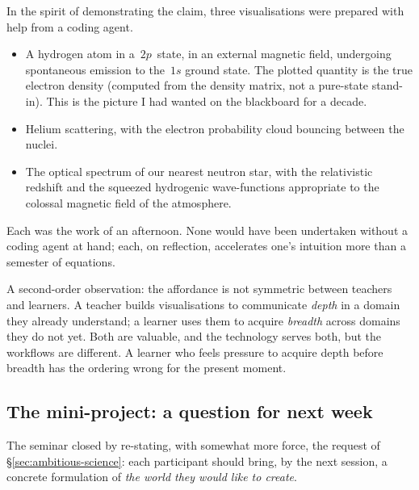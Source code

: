 \begin{historical}
  In the spirit of demonstrating the claim, three
  visualisations were prepared with help from a coding agent.
  \begin{itemize}
    \item A hydrogen atom in a~$2p$~state, in an external
      magnetic field, undergoing spontaneous emission to
      the~$1s$ ground state.  The plotted quantity is the
      true electron density (computed from the density
      matrix, not a pure-state stand-in).  This is the
      picture I had wanted on the blackboard for a decade.
    \item Helium scattering, with the electron probability
      cloud bouncing between the nuclei.
    \item The optical spectrum of our nearest neutron star,
      with the relativistic redshift and the squeezed
      hydrogenic wave-functions appropriate to the
      colossal magnetic field of the atmosphere.
  \end{itemize}
  Each was the work of an afternoon.  None would have
  been undertaken without a coding agent at hand; each, on
  reflection, accelerates one's intuition more than a
  semester of equations.
\end{historical}

\begin{remark}
  A second-order observation: the affordance is not
  symmetric between teachers and learners.  A teacher
  builds visualisations to communicate \emph{depth} in a
  domain they already understand; a learner uses them to
  acquire \emph{breadth} across domains they do not yet.
  Both are valuable, and the technology serves both, but
  the workflows are different.  A learner who feels
  pressure to acquire depth before breadth has the
  ordering wrong for the present moment.
\end{remark}

\subsection{The mini-project: a question for next week}\label{sec:mini-project}

The seminar closed by re-stating, with somewhat more force,
the request of \S\ref{sec:ambitious-science}: each
participant should bring, by the next session, a concrete
formulation of \emph{the world they would like to create}.

